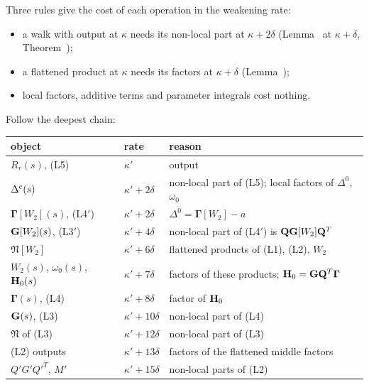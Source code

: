 \begin{detail}\label{d9:budget}
Three rules give the cost of each operation in the weakening rate:
\begin{itemize}
\item a walk with output at $\kappa$ needs its non-local part at $\kappa+2\delta$ (Lemma~ at $\kappa+\delta$, Theorem~);
\item a flattened product at $\kappa$ needs its factors at $\kappa+\delta$ (Lemma~);
\item local factors, additive terms and parameter integrals cost nothing.
\end{itemize}
\begin{step}
Follow the deepest chain:
\begin{center}\small
\begin{tabular}{@{}lll@{}}
\toprule
object & rate & reason\\
\midrule
$R_r(s)$, (L5) & $\kappa'$ & output\\
$\Delta^{\rm c}(s)$ & $\kappa'+2\delta$ & non-local part of (L5); local factors of $\Delta^0$, $\omega_0$\\
$\boldsymbol\Gamma[W_2](s)$, (L4$'$) & $\kappa'+2\delta$ & $\Delta^0=\boldsymbol\Gamma[W_2]-a$\\
$\mathbf G[W_2](s)$, (L3$'$) & $\kappa'+4\delta$ & non-local part of (L4$'$) is $\mathbf Q\mathbf G[W_2]\mathbf Q^T$\\
$\mathfrak N[W_2]$ & $\kappa'+6\delta$ & flattened products of (L1), (L2), $W_2$\\
$W_2(s)$, $\omega_0(s)$, $\mathbf H_0(s)$ & $\kappa'+7\delta$ & factors of these products; $\mathbf H_0=\mathbf G\mathbf Q^T\boldsymbol\Gamma$\\
$\boldsymbol\Gamma(s)$, (L4) & $\kappa'+8\delta$ & factor of $\mathbf H_0$\\
$\mathbf G(s)$, (L3) & $\kappa'+10\delta$ & non-local part of (L4)\\
$\mathfrak N$ of (L3) & $\kappa'+12\delta$ & non-local part of (L3)\\
(L2) outputs & $\kappa'+13\delta$ & factors of the flattened middle factors\\
$Q'G'Q'^T$, $M'$ & $\kappa'+15\delta$ & non-local parts of (L2)\\

\end{tabular}
\end{center}
\end{step}
\end{detail}
